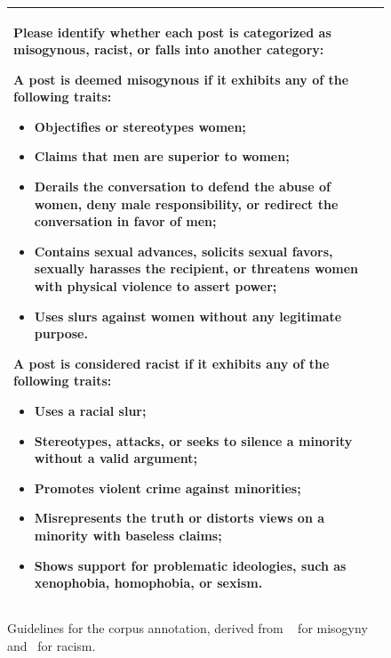\documentclass[11pt]{article}
\begin{document}
\begin{figure}[]
  \begin{footnotesize}
  \caption{Guidelines for the corpus annotation, derived from ~\cite{fersini2018overview-ibereval} for misogyny and~\cite{waseem2016hateful} for racism.}
  \label{fig:annotation-guidelines}
  \begin{tabular}{|p{}|}
  \hline
  \vspace{0mm}
  Please identify whether each post is categorized as misogynous, racist, or falls into another category:
  
  A post is deemed \textbf{misogynous} if it exhibits any of the following traits:
  \vspace{-2mm}
  \begin{itemize}
  \setlength\itemsep{0mm}
  \setlength{\parskip}{0pt}
  \setlength{\parsep}{0pt}
  \item Objectifies or stereotypes women;
  \item Claims that men are superior to women;
  \item Derails the conversation to defend the abuse of women, deny male responsibility, or redirect the conversation in favor of men;
  \item Contains sexual advances, solicits sexual favors, sexually harasses the recipient, or threatens women with physical violence to assert power;
  \item Uses slurs against women without any legitimate purpose.
  \end{itemize}
  
  \vspace{-2mm}
  A post is considered \textbf{racist} if it exhibits any of the following traits:
  \vspace{-2mm}
  \begin{itemize}
  \setlength\itemsep{0mm}
  \setlength{\parskip}{0pt}
  \setlength{\parsep}{0pt}
  \item Uses a racial slur;
  \item Stereotypes, attacks, or seeks to silence a minority without a valid argument;
  \item Promotes violent crime against minorities;
  \item Misrepresents the truth or distorts views on a minority with baseless claims;
  \item Shows support for problematic ideologies, such as xenophobia, homophobia, or sexism.
  \end{itemize}
  \\
  \hline
  \end{tabular}
  \end{footnotesize}
\end{figure}
\end{document}
